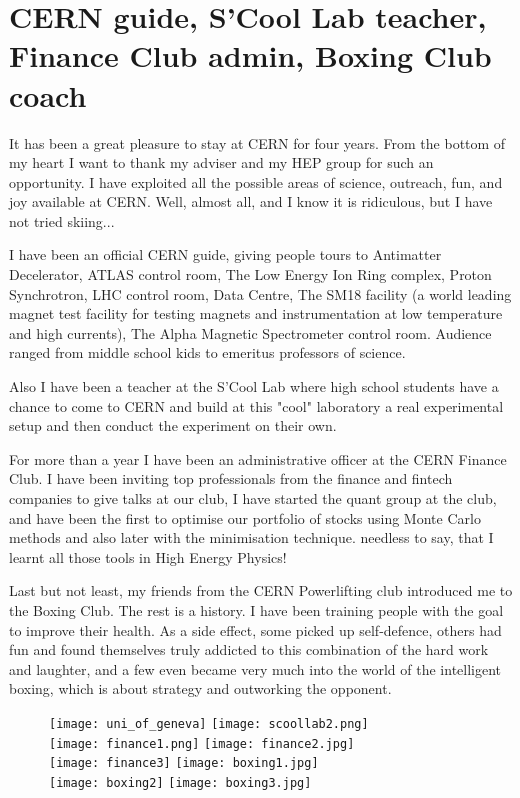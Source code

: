\clearpage

\section*{CERN guide, S'Cool Lab teacher, Finance Club admin, Boxing Club coach}
\small

It has been a great pleasure to stay at CERN for four years. From the bottom of my heart I want to thank my adviser and my HEP group for such an opportunity. I have exploited all the possible areas of science, outreach, fun, and joy available at CERN. Well, almost all, and I know it is ridiculous, but I have not tried skiing...

I have been an official CERN guide, giving people tours to Antimatter Decelerator, ATLAS control room, The Low Energy Ion Ring complex, Proton Synchrotron, LHC control room, Data Centre, The SM18 facility (a world leading magnet test facility for testing magnets and instrumentation at low temperature and high currents), The Alpha Magnetic Spectrometer control room. Audience ranged from middle school kids to emeritus professors of science. 

Also I have been a teacher at the S'Cool Lab where high school students have a chance to come to CERN and build at this "cool" laboratory a real experimental setup and then conduct the experiment on their own. 

For more than a year I have been an administrative officer at the CERN Finance Club. I have been inviting top professionals from the finance and fintech companies to give talks at our club, I have started the quant group at the club, and have been the first to optimise our portfolio of stocks using Monte Carlo methods and also later with the minimisation technique. needless to say, that I learnt all those tools in High Energy Physics!

Last but not least, my friends from the CERN Powerlifting club introduced me to the Boxing Club. The rest is a history. I have been training people with the goal to improve their health. As a side effect, some picked up self-defence, others had fun and found themselves truly addicted to this combination of the hard work and laughter, and a few even became very much into the world of the intelligent boxing, which is about strategy and outworking the opponent.



\iftrue
\begin{figure}[h]
     \texttt{[image: uni\_of\_geneva]}
     \texttt{[image: scoollab2.png]}\\
     \texttt{[image: finance1.png]}
     \texttt{[image: finance2.jpg]}\\
     \texttt{[image: finance3]}
     \texttt{[image: boxing1.jpg]}\\  
     \texttt{[image: boxing2]}
     \texttt{[image: boxing3.jpg]}\\

   \end{figure}
\fi


